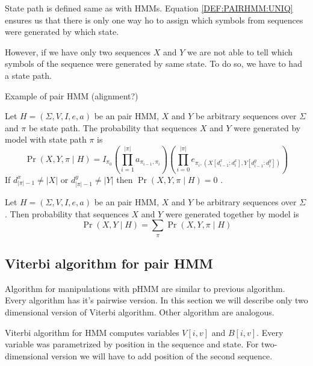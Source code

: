 State path is defined same as with HMMs. Equation \ref{DEF:PAIRHMM:UNIQ} ensures
us that there is only one way ho to assign which symbols from sequences were
generated by which state. 

However, if we have only two sequences $X$ and $Y$ we are not able to tell which
symbols of the sequence were generated by same state. To do so, we have to had a
state path.
\begin{example}
Example of pair HMM (alignment?)
\end{example}

\begin{definition}
Let $H=(\Sigma,V,I,e,a)$ be an pair HMM, $X$ and $Y$ be arbitrary sequences over
$\Sigma$ and $\pi$ be state path. The probability that sequences $X$ and $Y$
were generated by model with state path $\pi$ is
\begin{equation}
\Pr\left(X,Y,\pi\mid H\right)=
I_{\pi_0}
\left(
	\prod_{i=1}^{|\pi|}a_{\pi_{i-1},\pi_i}
\right)
\left(
	\prod_{i=0}^{|\pi|}e_{\pi_i,(X[d^x_{i-1}:d^x_{i}],Y[d^y_{i-1}:d^y_{i}])}
\right)
\end{equation}
If $d^x_{|\pi|-1}\not=|X|$ or $d^y_{|\pi|-1}\not=|Y|$ then
$\Pr\left(X,Y,\pi\mid H\right)=0$ .
\end{definition}

\begin{definition}
Let $H=(\Sigma,V,I,e,a)$ be an pair HMM, $X$ and $Y$ be arbitrary sequences over
$\Sigma$. Then probability that sequences $X$ and $Y$ were generated together by
model is 
\begin{equation}
\Pr\left(X,Y\mid H\right)=\sum_{\pi}\Pr\left(X,Y,\pi\mid H\right)
\end{equation}
\end{definition}

\subsection{Viterbi algorithm for pair HMM}

Algorithm for manipulations with pHMM are similar to previous algorithm. Every
algorithm has it's pairwise version. In this section we will describe only two
dimensional version of Viterbi algorithm. Other algorithm are analogous.

Viterbi algorithm for HMM computes variables $V[i,v]$ and $B[i,v]$. Every
variable was parametrized by position in the sequence and state. For
two-dimensional version we will have to add position of the second sequence.

